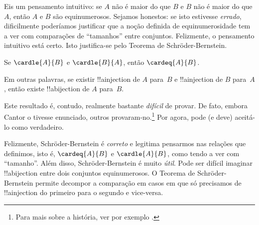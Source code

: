 \documentclass[../../../include/open-logic-section]{subfiles}
\begin{document}


\begin{explain}
Eis um pensamento intuitivo: se $A$ não é maior do que $B$ e $B$ não é maior do
que $A$, então $A$ e $B$ são equinumerosos. Sejamos honestos: se isto estivesse
\emph{errado}, dificilmente poderíamos justificar que a noção definida de
equinumerosidade tem a ver com comparações de ``tamanhos'' entre conjuntos.
Felizmente, o pensamento intuitivo está certo. Isto justifica-se pelo Teorema de
Schr\"oder-Bernstein.
\end{explain}

\begin{thm}
	Se $\cardle{A}{B}$ e $\cardle{B}{A}$,
	então $\cardeq{A}{B}$.
\end{thm}

\begin{explain}
Em outras palavras, se existir !!a{injection} de $A$ para~$B$ e !!a{injection} de
$B$ para~$A$, então existe !!a{bijection} de $A$ para~$B$.

Este resultado é, contudo, realmente bastante \emph{difícil} de provar. De
fato, embora Cantor o tivesse enunciado, outros provaram-no.\footnote{Para mais
sobre a história, ver por exemplo \citet[pp.~165--6]{Potter2004}.}
%
Por agora, pode (e deve) aceitá-lo como verdadeiro.

Felizmente, Schr\"oder-Bernstein é \emph{correto} e legitima pensarmos nas
relações que definimos, isto é, $\cardeq{A}{B}$ e $\cardle{A}{B}$, como tendo a ver
com ``tamanho''. Além disso, Schr\"oder-Bernstein é muito \emph{útil}. Pode ser
difícil imaginar !!a{bijection} entre dois conjuntos equinumerosos. O Teorema de
Schr\"oder-Bernstein permite decompor a comparação em casos em que só precisamos
de !!a{injection} do primeiro para o segundo e vice-versa.
\end{explain}
\end{document}
